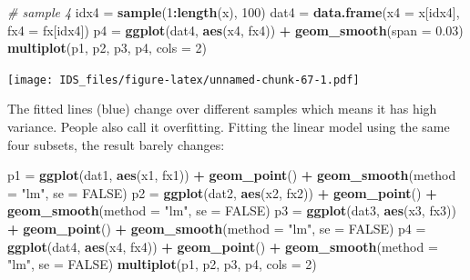 \documentclass[12pt,]{krantz}
\makeatletter
\newenvironment{Shaded}{\begin{snugshade}}{\end{snugshade}}
\newcommand{\CommentTok}[1]{\textcolor[rgb]{0.37,0.37,0.37}{\textit{#1}}}
\newcommand{\DataTypeTok}[1]{\textcolor[rgb]{0.27,0.27,0.27}{#1}}
\newcommand{\DecValTok}[1]{\textcolor[rgb]{0.06,0.06,0.06}{#1}}
\newcommand{\FloatTok}[1]{\textcolor[rgb]{0.06,0.06,0.06}{#1}}
\newcommand{\KeywordTok}[1]{\textcolor[rgb]{0.27,0.27,0.27}{\textbf{#1}}}
\newcommand{\NormalTok}[1]{#1}
\newcommand{\OperatorTok}[1]{\textcolor[rgb]{0.43,0.43,0.43}{\textbf{#1}}}
\newcommand{\OtherTok}[1]{\textcolor[rgb]{0.37,0.37,0.37}{#1}}
\newcommand{\StringTok}[1]{\textcolor[rgb]{0.5,0.5,0.5}{#1}}
\newenvironment{kframe}{%
\medskip{}
\setlength{\fboxsep}{.8em}
 \def\at@end@of@kframe{}%
 \ifinner\ifhmode%
  \def\at@end@of@kframe{\end{minipage}}%
  \begin{minipage}{\columnwidth}%
 \fi\fi%
 \def\FrameCommand##1{\hskip\@totalleftmargin \hskip-\fboxsep
 \colorbox{shadecolor}{##1}\hskip-\fboxsep
     \hskip-\linewidth \hskip-\@totalleftmargin \hskip\columnwidth}%
 \MakeFramed {\advance\hsize-\width
   \@totalleftmargin\z@ \linewidth\hsize
   \@setminipage}}%
 {\par\unskip\endMakeFramed%
 \at@end@of@kframe}
\renewenvironment{Shaded}{\begin{kframe}}{\end{kframe}}
\makeatother
\begin{document}
\begin{Shaded}
\begin{Highlighting}[]
\CommentTok{# sample 4}
\NormalTok{idx4 =}\StringTok{ }\KeywordTok{sample}\NormalTok{(}\DecValTok{1}\OperatorTok{:}\KeywordTok{length}\NormalTok{(x), }\DecValTok{100}\NormalTok{)}
\NormalTok{dat4 =}\StringTok{ }\KeywordTok{data.frame}\NormalTok{(}\DataTypeTok{x4 =}\NormalTok{ x[idx4], }\DataTypeTok{fx4 =}\NormalTok{ fx[idx4])}
\NormalTok{p4 =}\StringTok{ }\KeywordTok{ggplot}\NormalTok{(dat4, }\KeywordTok{aes}\NormalTok{(x4, fx4)) }\OperatorTok{+}\StringTok{ }\KeywordTok{geom_smooth}\NormalTok{(}\DataTypeTok{span =} \FloatTok{0.03}\NormalTok{)}
\KeywordTok{multiplot}\NormalTok{(p1, p2, p3, p4, }\DataTypeTok{cols =} \DecValTok{2}\NormalTok{)}
\end{Highlighting}
\end{Shaded}

\texttt{[image: IDS\_files/figure-latex/unnamed-chunk-67-1.pdf]}

The fitted lines (blue) change over different samples which means it has high variance. People also call it overfitting. Fitting the linear model using the same four subsets, the result barely changes:

\begin{Shaded}
\begin{Highlighting}[]
\NormalTok{p1 =}\StringTok{ }\KeywordTok{ggplot}\NormalTok{(dat1, }\KeywordTok{aes}\NormalTok{(x1, fx1)) }\OperatorTok{+}\StringTok{ }\KeywordTok{geom_point}\NormalTok{() }\OperatorTok{+}\StringTok{ }\KeywordTok{geom_smooth}\NormalTok{(}\DataTypeTok{method =} \StringTok{"lm"}\NormalTok{, }
    \DataTypeTok{se =} \OtherTok{FALSE}\NormalTok{)}
\NormalTok{p2 =}\StringTok{ }\KeywordTok{ggplot}\NormalTok{(dat2, }\KeywordTok{aes}\NormalTok{(x2, fx2)) }\OperatorTok{+}\StringTok{ }\KeywordTok{geom_point}\NormalTok{() }\OperatorTok{+}\StringTok{ }\KeywordTok{geom_smooth}\NormalTok{(}\DataTypeTok{method =} \StringTok{"lm"}\NormalTok{, }
    \DataTypeTok{se =} \OtherTok{FALSE}\NormalTok{)}
\NormalTok{p3 =}\StringTok{ }\KeywordTok{ggplot}\NormalTok{(dat3, }\KeywordTok{aes}\NormalTok{(x3, fx3)) }\OperatorTok{+}\StringTok{ }\KeywordTok{geom_point}\NormalTok{() }\OperatorTok{+}\StringTok{ }\KeywordTok{geom_smooth}\NormalTok{(}\DataTypeTok{method =} \StringTok{"lm"}\NormalTok{, }
    \DataTypeTok{se =} \OtherTok{FALSE}\NormalTok{)}
\NormalTok{p4 =}\StringTok{ }\KeywordTok{ggplot}\NormalTok{(dat4, }\KeywordTok{aes}\NormalTok{(x4, fx4)) }\OperatorTok{+}\StringTok{ }\KeywordTok{geom_point}\NormalTok{() }\OperatorTok{+}\StringTok{ }\KeywordTok{geom_smooth}\NormalTok{(}\DataTypeTok{method =} \StringTok{"lm"}\NormalTok{, }
    \DataTypeTok{se =} \OtherTok{FALSE}\NormalTok{)}
\KeywordTok{multiplot}\NormalTok{(p1, p2, p3, p4, }\DataTypeTok{cols =} \DecValTok{2}\NormalTok{)}
\end{Highlighting}
\end{Shaded}
\end{document}
